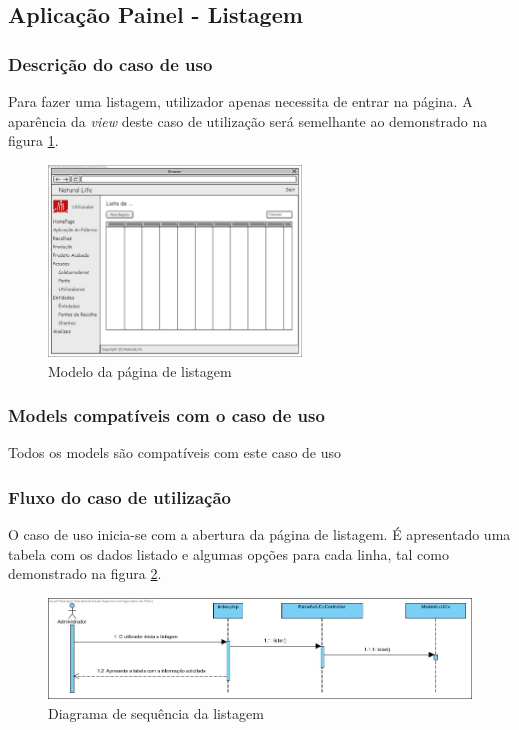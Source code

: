 \subsection{Aplicação Painel - Listagem}
\subsubsection*{Descrição do caso de uso}
Para fazer uma listagem, utilizador apenas necessita de entrar na página. A aparência da \textit{view} deste caso de utilização será semelhante ao demonstrado na figura \ref{fig:di_lista}. 

\begin{figure}[H] 
	\begin{center}
		\includegraphics[width=0.60\textwidth,keepaspectratio]{figuras/Diagramas_vp/DI_Painel_1_Lista.jpg}
		\caption{Modelo da página de listagem}
		\label{fig:di_lista} 
	\end{center}
\end{figure}

\subsubsection*{Models compatíveis com o caso de uso}
Todos os models são compatíveis com este caso de uso

\subsubsection*{Fluxo do caso de utilização}
O caso de uso inicia-se com a abertura da página de listagem. É apresentado uma tabela com os dados listado e algumas opções para cada linha, tal como demonstrado na figura \ref{fig:sd_lista}.


\begin{figure}[H] 
	\begin{center}
		\includegraphics[width=\textwidth,keepaspectratio]{figuras/Diagramas_vp/SD_Painel_1_Listar.jpg}
		\caption{Diagrama de sequência da listagem}
		\label{fig:sd_lista} 
	\end{center}
\end{figure}